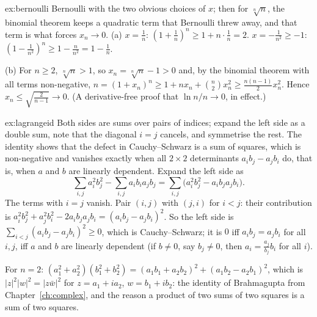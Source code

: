 \begin{solution}{ex:bernoulli}
\idea Bernoulli with the two obvious choices of $x$; then for $\sqrt[n]n$, the binomial theorem keeps a quadratic term that Bernoulli threw away, and that term is what forces $x_n\to0$.
\writeup (a) $x=\frac1n$: $(1+\frac1n)^n\ge1+n\cdot\frac1n=2$. $x=-\frac1{n^2}\ge-1$: $(1-\frac1{n^2})^n\ge1-\frac n{n^2}=1-\frac1n$.

(b) For $n\ge2$, $\sqrt[n]n>1$, so $x_n=\sqrt[n]n-1>0$ and, by the binomial theorem with all terms non-negative, $n=(1+x_n)^n\ge1+nx_n+\binom n2x_n^2\ge\frac{n(n-1)}2x_n^2$. Hence $x_n\le\sqrt{\frac2{n-1}}\to0$. (A derivative-free proof that $\ln n/n\to0$, in effect.)
\end{solution}

\begin{solution}{ex:lagrangeid}
\idea Both sides are sums over pairs of indices; expand the left side as a double sum, note that the diagonal $i=j$ cancels, and symmetrise the rest. The identity shows that the defect in Cauchy--Schwarz is a sum of squares, which is non-negative and vanishes exactly when all $2\times2$ determinants $a_ib_j-a_jb_i$ do, that is, when $a$ and $b$ are linearly dependent.
\writeup Expand the left side as
\[
\sum_{i,j}a_i^2b_j^2-\sum_{i,j}a_ib_ia_jb_j
=\sum_{i,j}\bigl(a_i^2b_j^2-a_ib_ja_jb_i\bigr).
\] The terms with $i=j$ vanish. Pair $(i,j)$ with $(j,i)$ for $i<j$: their contribution is $a_i^2b_j^2+a_j^2b_i^2-2a_ib_ja_jb_i=(a_ib_j-a_jb_i)^2$. So the left side is $\sum_{i<j}(a_ib_j-a_jb_i)^2\ge0$, which is Cauchy--Schwarz; it is $0$ iff $a_ib_j=a_jb_i$ for all $i,j$, iff $a$ and $b$ are linearly dependent (if $b\ne0$, say $b_j\ne0$, then $a_i=\frac{a_j}{b_j}b_i$ for all $i$).

For $n=2$: $(a_1^2+a_2^2)(b_1^2+b_2^2)=(a_1b_1+a_2b_2)^2+(a_1b_2-a_2b_1)^2$, which is $|z|^2|w|^2=|z\bar w|^2$ for $z=a_1+ia_2$, $w=b_1+ib_2$: the identity of Brahmagupta from Chapter~\ref{ch:complex}, and the reason a product of two sums of two squares is a sum of two squares.
\end{solution}

